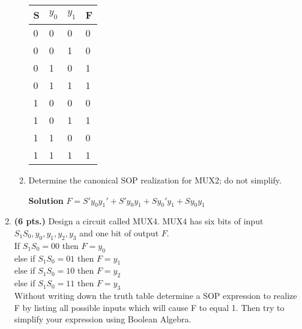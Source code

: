 \begin{enumerate}
\begin{enumerate}
\begin{onlysolution}
                                    \begin{tabular}{l|l|l|l}
                                        S & $y_0$ &  $y_1$ & F  \\ \hline \rowcolor{gray!15}
                                        0 & 0  &  0  & 0        \\ \hline
                                        0 & 0  &  1  & 0        \\ \hline \rowcolor{gray!15}
                                        0 & 1  &  0  & 1        \\ \hline
                                        0 & 1  &  1  & 1        \\ \hline \rowcolor{gray!15}
                                        1 & 0  &  0  & 0        \\ \hline
                                        1 & 0  &  1  & 1        \\ \hline \rowcolor{gray!15}
                                        1 & 1  &  0  & 0        \\ \hline
                                        1 & 1  &  1  & 1        \\
                                    \end{tabular}
                                \end{onlysolution}

                            \item Determine the canonical SOP realization for MUX2;
                                do not simplify.

                                \begin{onlysolution}  \textbf{Solution}
                                    $F = S' y_0 y_1' + S' y_0 y_1 + S y_0' y_1 + S y_0 y_1$
                                \end{onlysolution}
                        \end{enumerate}

                    \item \textbf{ (6 pts.)} Design a circuit called MUX4.  MUX4 has six bits of input
                        $S_1 S_0, y_0, y_1, y_2, y_3$ and one bit of output $F$.  \\
                        If      $S_1 S_0 = 00$ then $F=y_0$  \\
                        else if $S_1 S_0 = 01$ then $F=y_1$ \\
                        else if $S_1 S_0 = 10$ then $F=y_2$ \\
                        else if $S_1 S_0 = 11$ then $F=y_3$ \\
                        Without writing down the truth table determine a SOP expression
                        to realize F by listing all possible inputs which will cause F to equal 1.
                        Then try to simplify your expression using Boolean Algebra.


\end{enumerate}
